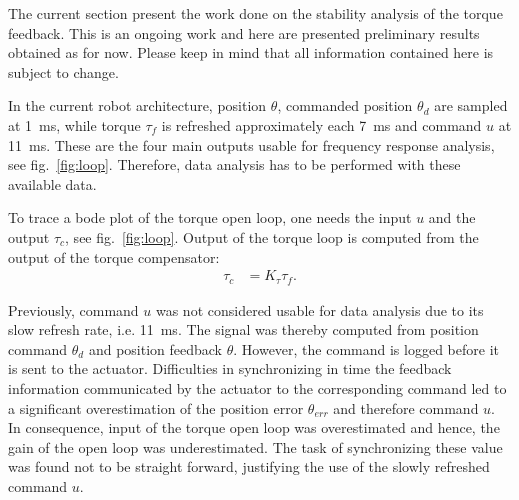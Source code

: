 The current section present the work done on the stability analysis of the torque feedback. This is an ongoing work and here are presented preliminary results obtained as for now. Please keep in mind that all information contained here is subject to change.

In the current robot architecture, position $\theta$, commanded position  $\theta_d$ are sampled at 1~ms, while torque $\tau_f$ is refreshed approximately each 7~ms and command $u$ at 11~ms. These are the four main outputs usable for frequency response analysis, see fig.~\ref{fig:loop}. Therefore, data analysis has to be performed with these available data.

%		



To trace a bode plot of the torque open loop, one needs the input $u$ and the output $\tau_c$, see fig.~\ref{fig:loop}. Output of the torque loop is computed from the output of the torque compensator:
\begin{align}
\tau_c &= K_{\tau}\tau_f. \label{eqn:tauc}
\end{align}

Previously, command $u$ was not considered usable for data analysis due to its slow refresh rate, i.e. 11~ms. The signal was thereby computed from position command $\theta_d$ and position feedback $\theta$. However, the command is logged before it is sent to the actuator. Difficulties in synchronizing in time the feedback information communicated by the actuator to the corresponding command led to a significant overestimation of the position error $\theta_{err}$ and therefore command $u$. In consequence, input of the torque open loop was overestimated and hence, the gain of the open loop was underestimated. The task of synchronizing these value was found not to be straight forward, justifying the use of the slowly refreshed command $u$.

